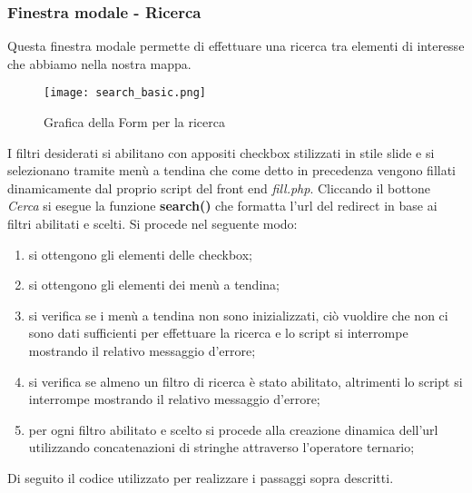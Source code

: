 \subsubsection{Finestra modale - Ricerca}
Questa finestra modale permette di effettuare una ricerca tra elementi di interesse che abbiamo nella nostra mappa.
\begin{figure}[h]
	\centering
	\caption{Grafica della Form per la ricerca}
	\label{fig:search_basic}
	\texttt{[image: search\_basic.png]}
\end{figure} 
I filtri desiderati si abilitano con appositi checkbox stilizzati in stile slide e si selezionano tramite menù a tendina che come detto in precedenza vengono fillati dinamicamente dal proprio script del front end \textit{fill.php}. \newline
Cliccando il bottone \textit{Cerca} si esegue la funzione \textbf{search()} che formatta l'url del redirect in base ai filtri abilitati e scelti.
Si procede nel seguente modo:
\begin{enumerate}
\item si ottengono gli elementi delle checkbox;
\item si ottengono gli elementi dei menù a tendina;
\item si verifica se i menù a tendina non sono inizializzati, ciò vuoldire che non ci sono dati sufficienti per effettuare la ricerca e lo script si interrompe mostrando il relativo messaggio d'errore;
\item si verifica se almeno un filtro di ricerca è stato abilitato, altrimenti lo script si interrompe mostrando il relativo messaggio d'errore;
\item per ogni filtro abilitato e scelto si procede alla creazione dinamica dell'url utilizzando concatenazioni di stringhe attraverso l'operatore ternario;
\end{enumerate}
Di seguito il codice utilizzato per realizzare i passaggi sopra descritti.
